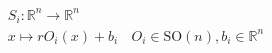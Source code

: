 \documentclass[preview]{standalone}
\begin{document}
\begin{align*}
S_i : \mathbb{R}^n \to \mathbb{R}^n \\ x \mapsto r O_i(x) + b_i \;\text{   } O_i \in \text{SO}(n), b_i \in \mathbb{R}^n \\
\end{align*}
\end{document}
